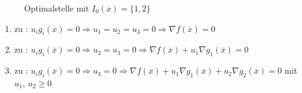 \begin{figure}[!htb]
	\centering
	
	\caption{Optimalstelle mit $I_0(\overline{x})=\{1,2\}$}
	\label{fig:kap_1_ktb_opt_1_2}
\end{figure}
\begin{enumerate}[label=\alph*)]
  \item zu : $u_ig_i(\overline{x})=0\Rightarrow u_1=u_2=u_3=0\Rightarrow \nabla f(\overline{x})=0$
  \item zu : $u_ig_i(\overline{x})=0\Rightarrow u_2=u_3=0\Rightarrow \nabla f(\overline{x})+u_1\nabla g_1(\overline{x})=0$
  \item zu : $u_ig_i(\overline{x})=0\Rightarrow u_3=0\Rightarrow \nabla f(\overline{x})+u_1\nabla g_1(\overline{x})+u_2\nabla g_2(\overline{x})=0$ mit
  $u_1$, $u_2\ge 0$\\
\end{enumerate}


